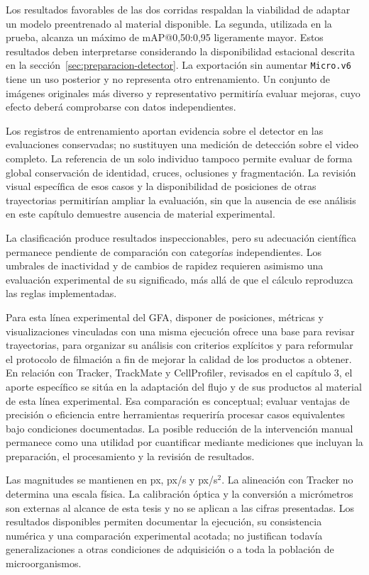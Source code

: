 Los resultados favorables de las dos corridas respaldan la viabilidad de adaptar un modelo preentrenado al material disponible. La segunda, utilizada en la prueba, alcanza un máximo de mAP@0,50:0,95 ligeramente mayor. Estos resultados deben interpretarse considerando la disponibilidad estacional descrita en la sección~\ref{sec:preparacion-detector}. La exportación sin aumentar \texttt{Micro.v6} tiene un uso posterior y no representa otro entrenamiento. Un conjunto de imágenes originales más diverso y representativo permitiría evaluar mejoras, cuyo efecto deberá comprobarse con datos independientes.

Los registros de entrenamiento aportan evidencia sobre el detector en las evaluaciones conservadas; no sustituyen una medición de detección sobre el video completo. La referencia de un solo individuo tampoco permite evaluar de forma global conservación de identidad, cruces, oclusiones y fragmentación. La revisión visual específica de esos casos y la disponibilidad de posiciones de otras trayectorias permitirían ampliar la evaluación, sin que la ausencia de ese análisis en este capítulo demuestre ausencia de material experimental.

La clasificación produce resultados inspeccionables, pero su adecuación científica permanece pendiente de comparación con categorías independientes. Los umbrales de inactividad y de cambios de rapidez requieren asimismo una evaluación experimental de su significado, más allá de que el cálculo reproduzca las reglas implementadas.

Para esta línea experimental del GFA, disponer de posiciones, métricas y visualizaciones vinculadas con una misma ejecución ofrece una base para revisar trayectorias, para organizar su análisis con criterios explícitos y para reformular el protocolo de filmación a fin de mejorar la calidad de los productos a obtener. En relación con Tracker, TrackMate y CellProfiler, revisados en el capítulo 3, el aporte específico se sitúa en la adaptación del flujo y de sus productos al material de esta línea experimental. Esa comparación es conceptual; evaluar ventajas de precisión o eficiencia entre herramientas requeriría procesar casos equivalentes bajo condiciones documentadas. La posible reducción de la intervención manual permanece como una utilidad por cuantificar mediante mediciones que incluyan la preparación, el procesamiento y la revisión de resultados.

Las magnitudes se mantienen en px, px/s y px/s$^2$. La alineación con Tracker no determina una escala física. La calibración óptica y la conversión a micrómetros son externas al alcance de esta tesis y no se aplican a las cifras presentadas. Los resultados disponibles permiten documentar la ejecución, su consistencia numérica y una comparación experimental acotada; no justifican todavía generalizaciones a otras condiciones de adquisición o a toda la población de microorganismos.
